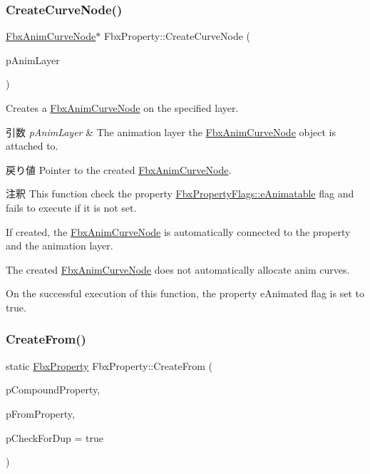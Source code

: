 \subsubsection{\texorpdfstring{Create\+Curve\+Node()}{CreateCurveNode()}}
{\footnotesize\ttfamily \hyperlink{class_fbx_anim_curve_node}{Fbx\+Anim\+Curve\+Node}$\ast$ Fbx\+Property\+::\+Create\+Curve\+Node (\begin{DoxyParamCaption}\item[{\hyperlink{class_fbx_anim_layer}{Fbx\+Anim\+Layer} $\ast$}]{p\+Anim\+Layer }\end{DoxyParamCaption})}

Creates a \hyperlink{class_fbx_anim_curve_node}{Fbx\+Anim\+Curve\+Node} on the specified layer. 
\begin{DoxyParams}{引数}
{\em p\+Anim\+Layer} & The animation layer the \hyperlink{class_fbx_anim_curve_node}{Fbx\+Anim\+Curve\+Node} object is attached to. \\
\hline
\end{DoxyParams}
\begin{DoxyReturn}{戻り値}
Pointer to the created \hyperlink{class_fbx_anim_curve_node}{Fbx\+Anim\+Curve\+Node}. 
\end{DoxyReturn}
\begin{DoxyRemark}{注釈}
This function check the property \hyperlink{class_fbx_property_flags_afabfa7e0949aac8a7dcdf8a141867e99ae2c562a65bb942f3f94631794bc3d257}{Fbx\+Property\+Flags\+::e\+Animatable} flag and fails to execute if it is not set. 

If created, the \hyperlink{class_fbx_anim_curve_node}{Fbx\+Anim\+Curve\+Node} is automatically connected to the property and the animation layer. 

The created \hyperlink{class_fbx_anim_curve_node}{Fbx\+Anim\+Curve\+Node} does not automatically allocate anim curves. 

On the successful execution of this function, the property e\+Animated flag is set to {\ttfamily true}. 
\end{DoxyRemark}
\mbox{\label{class_fbx_property_a333f52b93aca2083c6de7541a3911a65}} 
\subsubsection{\texorpdfstring{Create\+From()}{CreateFrom()}\hspace{0.1cm}{\footnotesize\ttfamily [1/2]}}
{\footnotesize\ttfamily static \hyperlink{class_fbx_property}{Fbx\+Property} Fbx\+Property\+::\+Create\+From (\begin{DoxyParamCaption}\item[{const \hyperlink{class_fbx_property}{Fbx\+Property} \&}]{p\+Compound\+Property,  }\item[{\hyperlink{class_fbx_property}{Fbx\+Property} \&}]{p\+From\+Property,  }\item[{bool}]{p\+Check\+For\+Dup = {\ttfamily true} }\end{DoxyParamCaption})\hspace{0.3cm}{\ttfamily [static]}}


